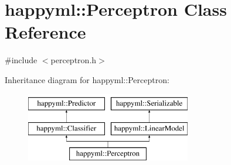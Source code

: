 \hypertarget{classhappyml_1_1Perceptron}{}\section{happyml\+:\+:Perceptron Class Reference}
\label{classhappyml_1_1Perceptron}


{\ttfamily \#include $<$perceptron.\+h$>$}

Inheritance diagram for happyml\+:\+:Perceptron\+:\begin{figure}[H]
\begin{center}
\leavevmode
\includegraphics[height=3.000000cm]{classhappyml_1_1Perceptron}
\end{center}
\end{figure}
